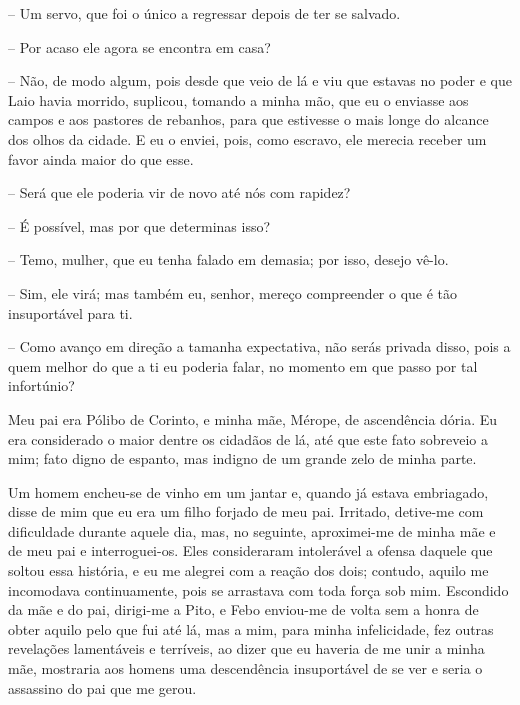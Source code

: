  --   Um servo, que foi o único a regressar depois de ter se salvado.

 --   Por acaso ele agora se encontra em casa?

 --   Não, de modo algum, pois desde que veio de lá e viu que estavas no poder
e que  Laio havia morrido, suplicou, tomando a minha mão, que eu o
enviasse aos campos e aos pastores de rebanhos, para que estivesse o
mais longe do alcance dos olhos da cidade. E eu o enviei, pois, como
escravo, ele merecia receber um favor ainda maior do que esse.

 --   Será que ele poderia vir de novo até nós com rapidez?

 --   É possível, mas por que determinas isso?

 --   Temo, mulher, que eu tenha falado em demasia; por isso, desejo vê-lo.

 --    Sim, ele virá; mas também eu, senhor, mereço compreender o que é
tão insuportável para ti.

 --   Como avanço em direção a tamanha expectativa, não serás privada disso,
pois a quem melhor do que a ti eu poderia falar, no momento em que passo
por tal infortúnio?

Meu pai era Pólibo de Corinto, e minha mãe, Mérope, de ascendência
dória. Eu era considerado o maior dentre os cidadãos de lá, até que este
fato sobreveio a mim; fato digno de espanto, mas indigno de um grande
zelo de minha parte.

 Um homem encheu-se de vinho em um jantar e, quando já estava
embriagado, disse de mim que eu era um filho forjado de meu pai.
Irritado, detive-me com dificuldade durante aquele dia, mas, no
seguinte, aproximei-me de minha mãe e de meu pai e interroguei-os. Eles
consideraram intolerável a ofensa daquele que soltou essa história, e eu
me alegrei com a reação dos dois; contudo, aquilo me incomodava
continuamente, pois se arrastava com toda força sob mim. Escondido da
mãe e do pai, dirigi-me a Pito, e Febo enviou-me de volta sem a honra de
obter aquilo pelo que fui até  lá, mas a mim, para minha
infelicidade, fez outras revelações lamentáveis e terríveis, ao dizer
que eu haveria de me unir a minha mãe, mostraria aos homens uma
descendência insuportável de se ver e seria o assassino do pai que me
gerou.


